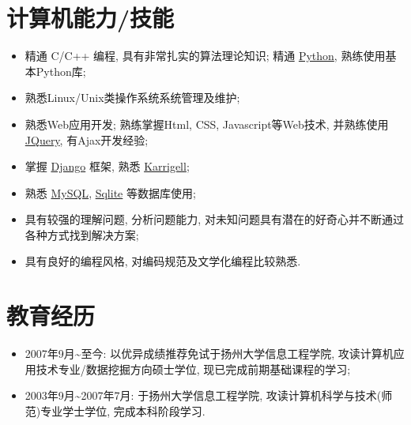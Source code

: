 \documentclass[a4paper,10pt,english]{manual}
\begin{document}
\section{计算机能力/技能}
\begin{itemize}
\item {} 
精通 C/C++ 编程, 具有非常扎实的算法理论知识; 精通 \href{http://www.python.org/}{Python}, 熟练使用基本Python库;

\item {} 
熟悉Linux/Unix类操作系统系统管理及维护;

\item {} 
熟悉Web应用开发; 熟练掌握Html, CSS, Javascript等Web技术, 并熟练使用 \href{http://jquery.com}{JQuery}, 有Ajax开发经验;

\item {} 
掌握 \href{http://www.djangoproject.com/}{Django} 框架, 熟悉 \href{http://karrigell.sourceforge.net/}{Karrigell};

\item {} 
熟悉 \href{http://www.mysql.com}{MySQL}, \href{http://www.sqlite.org}{Sqlite} 等数据库使用;

\item {} 
具有较强的理解问题, 分析问题能力, 对未知问题具有潜在的好奇心并不断通过各种方式找到解决方案;

\item {} 
具有良好的编程风格, 对编码规范及文学化编程比较熟悉.

\end{itemize}


\section{教育经历}
\begin{itemize}
\item {} 
2007年9月\textasciitilde{}至今: 以优异成绩推荐免试于扬州大学信息工程学院, 攻读计算机应用技术专业/数据挖掘方向硕士学位, 现已完成前期基础课程的学习;

\item {} 
2003年9月\textasciitilde{}2007年7月: 于扬州大学信息工程学院, 攻读计算机科学与技术(师范)专业学士学位, 完成本科阶段学习.

\end{itemize}
\end{document}
